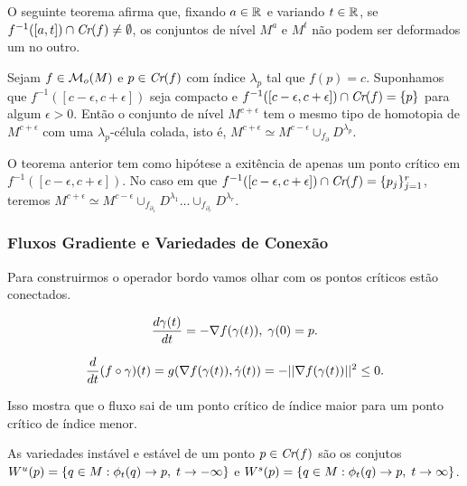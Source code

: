\documentclass{beamer}
\begin{document}
	\begin{frame}
		O seguinte teorema afirma que, fixando $a \in \mathbb{R}^{}$ e variando $t \in \mathbb{R}^{}$, se $f^{-1}([a,t]) \cap \textit{Cr}(f) \neq \emptyset$, os conjuntos de nível $M^{a}$ e $M^{t}$ não podem ser deformados um no outro.
		
		\begin{teorema}
			Sejam $f\in \mathcal{M}_{o}(M)$ e $p\in \textit{Cr}(f)$ com índice $\lambda_{p}$ tal que $f(p) = c$. Suponhamos que $f^{-1}([c-\epsilon,c+\epsilon])$ seja compacto e $f^{-1}([c-\epsilon,c+\epsilon])\cap \textit{Cr}(f) = \{p\}$ para algum $\epsilon>0$. Então o conjunto de nível $M^{c+\epsilon}$ tem o mesmo tipo de homotopia de $M^{c+\epsilon}$ com uma $\lambda_{p}$-célula colada, isto é, $M^{c+\epsilon} \simeq M^{c-\epsilon}\cup_{f_{\partial}} D^{\lambda_{p}}$.
		\end{teorema}
		
		\pause
		\begin{observacao}
			O teorema anterior tem como hipótese a exitência de apenas um ponto crítico em $f^{-1}([c-\epsilon,c+\epsilon])$. No caso em que $f^{-1}([c-\epsilon,c+\epsilon]) \cap \textit{Cr}(f) = \{p_{j}\}_{j=1}^{r}$, teremos $M^{c+\epsilon} \simeq M^{c-\epsilon}\cup_{f_{\partial_{1}}} D^{\lambda_{1}}\dots  \cup_{f_{\partial_{r}}} D^{\lambda_{r}}$.
		\end{observacao}
	\end{frame}
	
	\begin{frame}
		
		\frametitle{Fluxos Gradiente e Variedades de Conexão}
		\begin{tiny}
			Para construirmos o operador bordo vamos olhar com os pontos críticos estão conectados.
		\end{tiny}
		
		\begin{definicao}[Gradiente negativo]
				$$
				\frac{d \gamma(t)}{d t} = -\nabla f(\gamma(t)), \; \gamma(0) = p.
				$$
		\end{definicao}
		
		$$
		\frac{d }{d t}(f \circ \gamma)(t) = g(\nabla f(\gamma(t)), \dot{\gamma}(t)) 
		=-||\nabla f(\gamma(t))||^{2}
		\leq 0.
		$$
		\begin{tiny}
			Isso mostra que o fluxo sai de um ponto crítico de 
			índice maior para um ponto crítico de índice menor.
		\end{tiny}
		
		\pause
		\begin{definicao}
			As variedades instável e estável de um ponto $p \in \textit{Cr}(f)$ são os conjutos $W^{u}(p) = \{q\in M: \phi_{t}(q) \to p,\; t\to -\infty\}$ e $W^{s}(p) = \{q\in M: \phi_{t}(q) \to p,\; t\to \infty\}$.
		\end{definicao}
		
	\end{frame}
	
\end{document}
